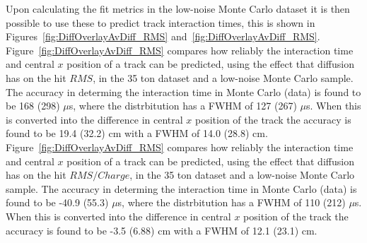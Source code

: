 Upon calculating the fit metrics in the low-noise Monte Carlo dataset it is then possible to use these to predict track interaction times, this is shown in Figures~\ref{fig:DiffOverlayAvDiff_RMS} and~\ref{fig:DiffOverlayAvDiff_RMS}. Figure~\ref{fig:DiffOverlayAvDiff_RMS} compares how reliably the interaction time and central $x$ position of a track can be predicted, using the effect that diffusion has on the hit $RMS$, in the 35 ton dataset and a low-noise Monte Carlo sample. The accuracy in determing the interaction time in Monte Carlo (data) is found to be 168 (298) $\mu$s, where the distrbitution has a FWHM of 127 (267) $\mu$s. When this is converted into the difference in central $x$ position of the track the accuracy is found to be 19.4 (32.2) cm with a FWHM of 14.0 (28.8) cm. Figure~\ref{fig:DiffOverlayAvDiff_RMS} compares how reliably the interaction time and central $x$ position of a track can be predicted, using the effect that diffusion has on the hit $RMS/Charge$, in the 35 ton dataset and a low-noise Monte Carlo sample. The accuracy in determing the interaction time in Monte Carlo (data) is found to be -40.9 (55.3) $\mu$s, where the distrbitution has a FWHM of 110 (212) $\mu$s. When this is converted into the difference in central $x$ position of the track the accuracy is found to be -3.5 (6.88) cm with a FWHM of 12.1 (23.1) cm. \\

